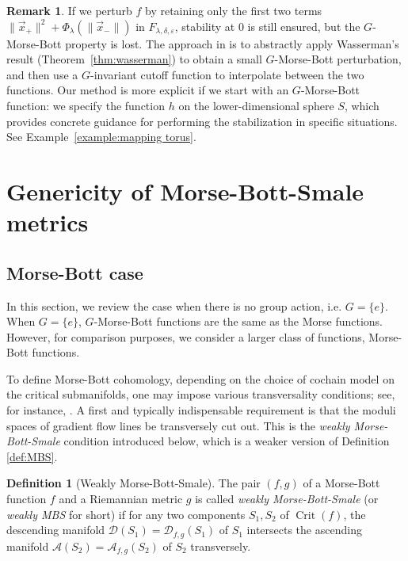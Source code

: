 \documentclass[11pt]{amsart}
\theoremstyle{definition}
\newtheorem{definition}[theorem]{Definition}
\newtheorem{remark}[theorem]{Remark}
\numberwithin{equation}{subsection}
\DeclareMathOperator{\crit}{Crit}
\newcommand{\des}{\mathscr{D}}
\newcommand{\asc}{\mathscr{A}}
\begin{document}
\begin{remark}\label{remark:comparisonMayer}
If we perturb $f$ by retaining only the first two terms 
$\|\vec{x}_+\|^{2}+\Phi_{\lambda}(\|\vec{x}_-\|)$ in 
$F_{\lambda,\delta,\varepsilon}$, stability at $0$ is still ensured, but the 
$G$-Morse-Bott property is lost. The approach in 
\cite{mayer1989Ginvariant} is to abstractly apply Wasserman’s result 
(Theorem~\ref{thm:wasserman}) to obtain a small $G$-Morse-Bott perturbation, and 
then use a $G$-invariant cutoff function to interpolate between the two functions. 
Our method is more explicit if we start with an $G$-Morse-Bott function: we specify the function $h$ on the lower-dimensional 
sphere $S$, which provides concrete guidance for performing the stabilization in 
specific situations. See Example~\ref{example:mapping torus}.

\end{remark}



\section{Genericity of Morse-Bott-Smale metrics}\label{section:genericity}

\subsection{Morse-Bott case}
In this section, we review the case when there is no group action, i.e. $G = \{e\}$. When $G = \{e\}$, $G$-Morse-Bott functions are the same as the Morse functions. However, for comparison purposes, we consider a larger class of functions, Morse-Bott functions. 

To define Morse-Bott cohomology, depending on the choice of cochain model on the 
critical submanifolds, one may impose various transversality conditions; see, for instance,  \cite{Fukaya96,AustinBraam,hutchings2002lecture,BanyagaHurtubise,zhuang2025analytictopologicalrealizationsinvariant}. A first and typically indispensable requirement is that the moduli spaces of gradient flow lines be transversely cut out. This is the \emph{weakly Morse-Bott-Smale} condition introduced below, which is a weaker version of Definition \ref{def:MBS}.

\begin{definition}[Weakly Morse-Bott-Smale]\label{def:weakMBS}
   The pair $(f,g)$ of a Morse-Bott function $f$ and a Riemannian metric $g$ is called \emph{weakly Morse-Bott-Smale} (or \emph{weakly MBS} for short) if for any two components $S_1,S_2$ of $\crit(f)$, the descending manifold $\des(S_1) = \des_{f,g}(S_1)$ of $S_1$ intersects the ascending manifold $\asc(S_2) = \asc_{f,g}(S_2)$ of $S_2$ transversely. 
\end{definition}
\end{document}
